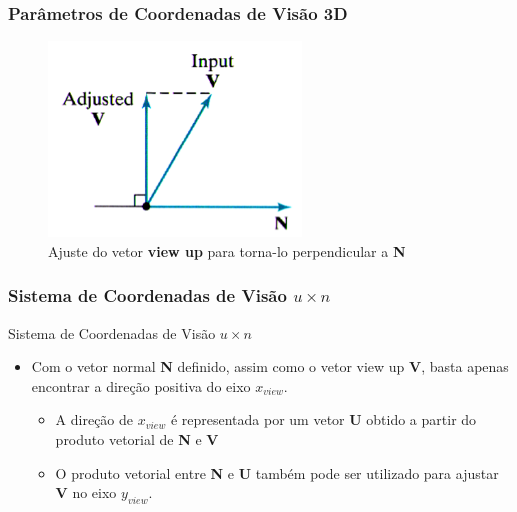 \documentclass{beamer}
\begin{document}
\begin{frame}
\frametitle{Parâmetros de Coordenadas de Visão 3D}

	\begin{figure}[!h]
			\begin{center}
			\includegraphics[width=0.6\textwidth]{Figures/VecPro}
			\caption{Ajuste do vetor \textbf{view up} para torna-lo perpendicular a \textbf{N}}
			\end{center}
	\end{figure}

\end{frame}

\begin{frame}
\frametitle{Sistema de Coordenadas de Visão $u \times n$}
	\begin{block}{Sistema de Coordenadas de Visão $u \times n$}
		\begin{itemize}
			\item Com o vetor normal \textbf{N} definido, assim como o vetor view up \textbf{V}, basta apenas encontrar a direção positiva do eixo $x_{view}$.
			\begin{itemize}
				\item A direção de $x_{view}$ é representada por um vetor \textbf{U} obtido a partir do produto vetorial de \textbf{N} e \textbf{V}
				\item O produto vetorial entre \textbf{N} e \textbf{U} também pode ser utilizado para ajustar \textbf{V} no eixo $y_{view}$.
			\end{itemize}
		\end{itemize}
	\end{block}
\end{frame}
\end{document}

